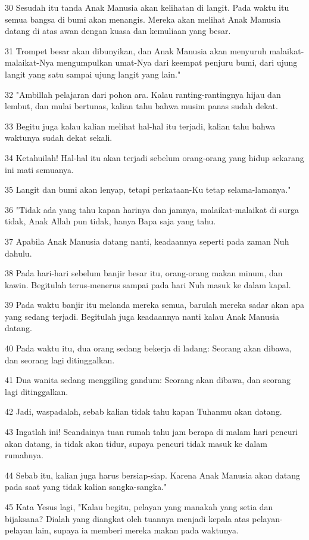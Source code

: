 \par 30 Sesudah itu tanda Anak Manusia akan kelihatan di langit. Pada waktu itu semua bangsa di bumi akan menangis. Mereka akan melihat Anak Manusia datang di atas awan dengan kuasa dan kemuliaan yang besar.
\par 31 Trompet besar akan dibunyikan, dan Anak Manusia akan menyuruh malaikat-malaikat-Nya mengumpulkan umat-Nya dari keempat penjuru bumi, dari ujung langit yang satu sampai ujung langit yang lain."
\par 32 "Ambillah pelajaran dari pohon ara. Kalau ranting-rantingnya hijau dan lembut, dan mulai bertunas, kalian tahu bahwa musim panas sudah dekat.
\par 33 Begitu juga kalau kalian melihat hal-hal itu terjadi, kalian tahu bahwa waktunya sudah dekat sekali.
\par 34 Ketahuilah! Hal-hal itu akan terjadi sebelum orang-orang yang hidup sekarang ini mati semuanya.
\par 35 Langit dan bumi akan lenyap, tetapi perkataan-Ku tetap selama-lamanya."
\par 36 "Tidak ada yang tahu kapan harinya dan jamnya, malaikat-malaikat di surga tidak, Anak Allah pun tidak, hanya Bapa saja yang tahu.
\par 37 Apabila Anak Manusia datang nanti, keadaannya seperti pada zaman Nuh dahulu.
\par 38 Pada hari-hari sebelum banjir besar itu, orang-orang makan minum, dan kawin. Begitulah terus-menerus sampai pada hari Nuh masuk ke dalam kapal.
\par 39 Pada waktu banjir itu melanda mereka semua, barulah mereka sadar akan apa yang sedang terjadi. Begitulah juga keadaannya nanti kalau Anak Manusia datang.
\par 40 Pada waktu itu, dua orang sedang bekerja di ladang: Seorang akan dibawa, dan seorang lagi ditinggalkan.
\par 41 Dua wanita sedang menggiling gandum: Seorang akan dibawa, dan seorang lagi ditinggalkan.
\par 42 Jadi, waspadalah, sebab kalian tidak tahu kapan Tuhanmu akan datang.
\par 43 Ingatlah ini! Seandainya tuan rumah tahu jam berapa di malam hari pencuri akan datang, ia tidak akan tidur, supaya pencuri tidak masuk ke dalam rumahnya.
\par 44 Sebab itu, kalian juga harus bersiap-siap. Karena Anak Manusia akan datang pada saat yang tidak kalian sangka-sangka."
\par 45 Kata Yesus lagi, "Kalau begitu, pelayan yang manakah yang setia dan bijaksana? Dialah yang diangkat oleh tuannya menjadi kepala atas pelayan-pelayan lain, supaya ia memberi mereka makan pada waktunya.

